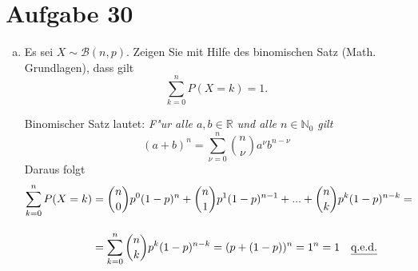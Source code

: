 \section{Aufgabe 30}
\setcounter{section}{30}

\begin{enumerate}[(a)]
    \item Es sei $X\sim\mathcal{B}(n,p)$. Zeigen Sie mit Hilfe des binomischen
        Satz (Math. Grundlagen), dass gilt $$\sum_{k=0}^nP(X=k)=1.$$

        Binomischer Satz lautet: \textit{F"ur alle $a, b \in \mathbb{R}$ und alle $n \in \mathbb{N}_0$ gilt}
        \begin{equation}
            (a + b)^n = \sum_{\nu = 0}^n\binom{n}{\nu}a^{\nu}b^{n - \nu}
        \end{equation}
        Daraus folgt
        \begin{align*}
            \sum_{k=0}^nP(X=k) &= \binom{n}{0}p^0(1 - p)^{n} + \binom{n}{1}p^1(1 - p)^{n - 1} + ... + \binom{n}{k}p^k(1 - p)^{n - k} = \\[10pt]
                               &= \sum_{k = 0}^n\binom{n}{k}p^k(1 - p)^{n - k} = (p + (1 - p))^n = 1^n = 1 \quad \text{\underline{q.e.d.}}
        \end{align*}
\end{enumerate}
